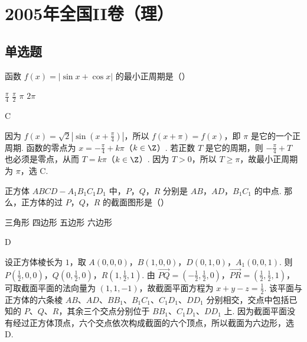 \chapter{2005年全国II卷（理）}
\section{单选题}
\begin{problem}
函数 \( f(x) = |\sin x + \cos x| \) 的最小正周期是（\quad）

\choices
    {\( \frac{\pi}{4} \)}
    {\( \frac{\pi}{2} \)}
    {\(\pi\)}
    {\(2\pi\)}
\end{problem}

\begin{answer}
C
\end{answer}

\begin{solution}
因为 \(f(x)=\sqrt{2}\left|\sin\left(x+\frac{\pi}{4}\right)\right|\)，所以 \(f(x+\pi)=f(x)\)，即 \(\pi\) 是它的一个正周期. 函数的零点为 \(x=-\frac{\pi}{4}+k\pi\)（\(k\in\Z\)）. 若正数 \(T\) 是它的周期，则 \(-\frac{\pi}{4}+T\) 也必须是零点，从而 \(T=k\pi\)（\(k\in\Z\)）. 因为 \(T>0\)，所以 \(T\geqslant\pi\)，故最小正周期为 \(\pi\)，选 C.
\end{solution}

\begin{problem}
正方体 \(ABCD - A_{1}B_{1}C_{1}D_{1}\) 中，\(P\)，\(Q\)，\(R\) 分别是 \(AB\)，\(AD\)，\(B_{1}C_{1}\) 的中点. 那么，正方体的过 \(P\)，\(Q\)，\(R\) 的截面图形是（\quad）

\choices
    {三角形}
    {四边形}
    {五边形}
    {六边形}
\end{problem}

\begin{answer}
D
\end{answer}

\begin{solution}
设正方体棱长为 \(1\)，取 \(A(0,0,0)\)，\(B(1,0,0)\)，\(D(0,1,0)\)，\(A_1(0,0,1)\). 则 \(P\left(\frac{1}{2},0,0\right)\)，\(Q\left(0,\frac{1}{2},0\right)\)，\(R\left(1,\frac{1}{2},1\right)\). 由 \(\overrightarrow{PQ}=\left(-\frac{1}{2},\frac{1}{2},0\right)\)，\(\overrightarrow{PR}=\left(\frac{1}{2},\frac{1}{2},1\right)\)，可取截面平面的法向量为 \((1,1,-1)\)，故截面平面方程为 \(x+y-z=\frac{1}{2}\). 该平面与正方体的六条棱 \(AB\)、\(AD\)、\(BB_1\)、\(B_1C_1\)、\(C_1D_1\)、\(DD_1\) 分别相交，交点中包括已知的 \(P\)、\(Q\)、\(R\)，其余三个交点分别位于 \(BB_1\)、\(C_1D_1\)、\(DD_1\) 上. 因为截面平面没有经过正方体顶点，六个交点依次构成截面的六个顶点，所以截面为六边形，选 D.
\end{solution}

